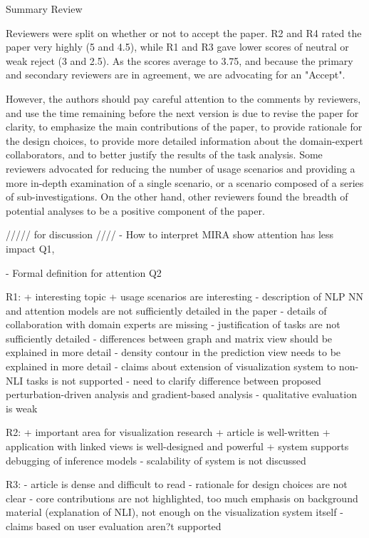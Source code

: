 Summary Review

Reviewers were split on whether or not to accept the paper. R2 and R4 rated the paper very highly (5 and 4.5), while R1 and R3 gave lower scores of neutral or weak reject (3 and 2.5). As the scores average to 3.75, and because the primary and secondary reviewers are in agreement, we are advocating for an "Accept".

However, the authors should pay careful attention to the comments by reviewers, and use the time remaining before the next version is due to revise the paper for clarity, to emphasize the main contributions of the paper, to provide rationale for the design choices, to provide more detailed information about the domain-expert collaborators, and to better justify the results of the task analysis. Some reviewers advocated for reducing the number of usage scenarios and providing a more in-depth examination of a single scenario, or a scenario composed of a series of sub-investigations. On the other hand, other reviewers found the breadth of potential analyses to be a positive component of the paper.

///// for discussion ////
- How to interpret MIRA show attention has less impact
Q1,

- Formal definition for attention
Q2

R1:
+ interesting topic
+ usage scenarios are interesting
- description of NLP NN and attention models are not sufficiently detailed in the paper
- details of collaboration with domain experts are missing
- justification of tasks are not sufficiently detailed
- differences between graph and matrix view should be explained in more detail
- density contour in the prediction view needs to be explained in more detail
- claims about extension of visualization system to non-NLI tasks is not supported
- need to clarify difference between proposed perturbation-driven analysis and gradient-based analysis
- qualitative evaluation is weak

R2:
+ important area for visualization research
+ article is well-written
+ application with linked views is well-designed and powerful
+ system supports debugging of inference models
- scalability of system is not discussed

R3:
- article is dense and difficult to read
- rationale for design choices are not clear
- core contributions are not highlighted, too much emphasis on background material (explanation of NLI), not enough on the visualization system itself
- claims based on user evaluation aren?t supported

